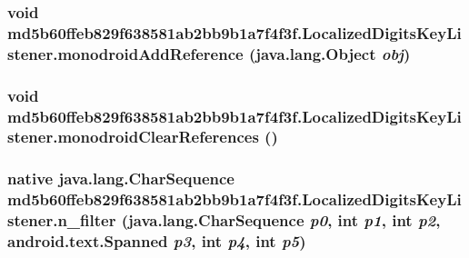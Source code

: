 \hypertarget{classmd5b60ffeb829f638581ab2bb9b1a7f4f3f_1_1_localized_digits_key_listener_a59c658d0bc78ec1affdbe58599ce60e}{
\subsubsection[{monodroidAddReference}]{\setlength{\rightskip}{0pt plus 5cm}void md5b60ffeb829f638581ab2bb9b1a7f4f3f.LocalizedDigitsKeyListener.monodroidAddReference (java.lang.Object {\em obj})}}
\label{classmd5b60ffeb829f638581ab2bb9b1a7f4f3f_1_1_localized_digits_key_listener_a59c658d0bc78ec1affdbe58599ce60e}


\hypertarget{classmd5b60ffeb829f638581ab2bb9b1a7f4f3f_1_1_localized_digits_key_listener_1cc96ff80d2ae18b0cfa194517fa6aa3}{
\subsubsection[{monodroidClearReferences}]{\setlength{\rightskip}{0pt plus 5cm}void md5b60ffeb829f638581ab2bb9b1a7f4f3f.LocalizedDigitsKeyListener.monodroidClearReferences ()}}
\label{classmd5b60ffeb829f638581ab2bb9b1a7f4f3f_1_1_localized_digits_key_listener_1cc96ff80d2ae18b0cfa194517fa6aa3}


\hypertarget{classmd5b60ffeb829f638581ab2bb9b1a7f4f3f_1_1_localized_digits_key_listener_7d8fd81af59fcfb834b8732fdbe30352}{
\subsubsection[{n\_\-filter}]{\setlength{\rightskip}{0pt plus 5cm}native java.lang.CharSequence md5b60ffeb829f638581ab2bb9b1a7f4f3f.LocalizedDigitsKeyListener.n\_\-filter (java.lang.CharSequence {\em p0}, \/  int {\em p1}, \/  int {\em p2}, \/  android.text.Spanned {\em p3}, \/  int {\em p4}, \/  int {\em p5})}}
\label{classmd5b60ffeb829f638581ab2bb9b1a7f4f3f_1_1_localized_digits_key_listener_7d8fd81af59fcfb834b8732fdbe30352}



